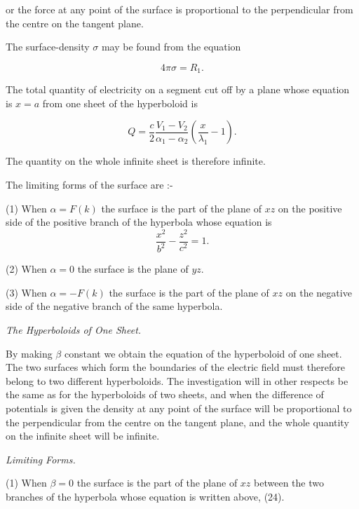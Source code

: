 \documentclass[11pt,a4paper]{article}
\begin{document}
or the force at any point of the surface is proportional to the perpendicular from the centre on the tangent plane.

The surface-density  $\sigma$  may be found from the equation

\begin{equation}\tag{22}
4\pi\sigma = R_1.
\end{equation}

The total quantity of electricity on a segment cut off by a plane whose equation is $x=a$ from one sheet of the hyperboloid is

\begin{equation}\tag{23}
Q=\frac{c}{2}\frac{V_1-V_2}{\alpha_1-\alpha_2}\left(\frac{x}{\lambda_1}-1\right).
\end{equation}

The quantity on the whole infinite sheet is therefore infinite.

The limiting forms of the surface are :-

(1) When $\alpha=F(k)$ the surface is the part of the plane of $xz$ on the positive side of the positive branch of the hyperbola whose equation is
\begin{equation}\tag{24}
\frac{x^2}{b^2}-\frac{z^2}{c^2}=1.
\end{equation}

(2) When $\alpha=0$ the surface is the plane of $yz$.

(3) When $\alpha=-F(k)$ the surface is the part of the plane of $xz$ on the negative side of the negative branch of the same hyperbola.

{\centering\itshape The Hyperboloids of One Sheet.\par}

By making $\beta$ constant we obtain the equation of the hyperboloid of one sheet. The two surfaces which form the boundaries of the electric field must therefore belong to two different hyperboloids. The investigation will in other respects be the same as for the hyperboloids of two sheets, and when the difference of potentials is given the density at any point of the surface will be proportional to the perpendicular from the centre on the tangent plane, and the whole quantity on the infinite sheet will be infinite.

{\centering\itshape Limiting Forms.\par}

(1) When $\beta=0$ the surface is the part of the plane of $xz$ between the two branches of the hyperbola whose equation is written above, (24).
\end{document}
